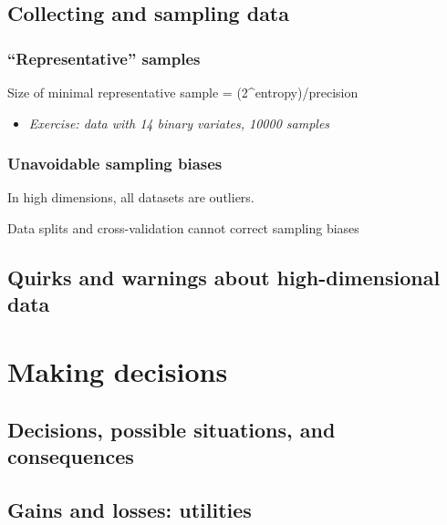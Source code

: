 \documentclass[
  a4paper,
  DIV=11,
  numbers=noendperiod,
  oneside]{scrreprt}
\providecommand{\tightlist}{%
  \setlength{\itemsep}{0pt}\setlength{\parskip}{0pt}}\usepackage{longtable,booktabs,array}
\begin{document}
\hypertarget{collecting-and-sampling-data}{%
\section{Collecting and sampling
data}\label{collecting-and-sampling-data}}

\hypertarget{representative-samples}{%
\subsection{``Representative'' samples}\label{representative-samples}}

Size of minimal representative sample = (2\^{}entropy)/precision

\begin{itemize}
\tightlist
\item
  \emph{Exercise: data with 14 binary variates, 10000 samples}
\end{itemize}

\hypertarget{unavoidable-sampling-biases}{%
\subsection{Unavoidable sampling
biases}\label{unavoidable-sampling-biases}}

In high dimensions, all datasets are outliers.

Data splits and cross-validation cannot correct sampling biases

\hypertarget{quirks-and-warnings-about-high-dimensional-data}{%
\section{Quirks and warnings about high-dimensional
data}\label{quirks-and-warnings-about-high-dimensional-data}}

\hypertarget{making-decisions}{%
\chapter{Making decisions}\label{making-decisions}}

\hypertarget{decisions-possible-situations-and-consequences}{%
\section{Decisions, possible situations, and
consequences}\label{decisions-possible-situations-and-consequences}}

\hypertarget{gains-and-losses-utilities}{%
\section{Gains and losses: utilities}\label{gains-and-losses-utilities}}
\end{document}
